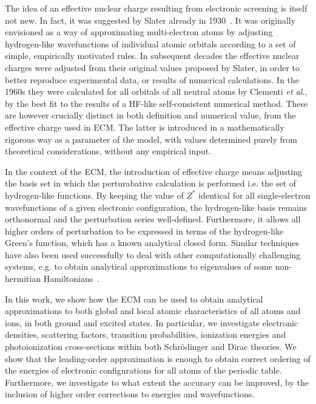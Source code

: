 The idea of an effective nuclear charge resulting from electronic screening is itself not new. In fact, it was suggested by Slater already in 1930~\cite{slater_atomic_1930}. It was originally envisioned as a way of approximating multi-electron atoms by adjusting hydrogen-like wavefunctions of individual atomic orbitals according to a set of simple, empirically motivated rules. In subsequent decades the effective nuclear charges were adjusted from their original values proposed by Slater, in order to better reproduce experimental data, or results of numerical calculations. In the 1960s they were calculated for all orbitals of all neutral atoms by Clementi \textit{et al.}\cite{clementi1963atomic, clementi1967atomic}, by the best fit to the results of a HF-like self-consistent numerical method. These are however crucially distinct in both definition and numerical value, from the effective charge used in ECM. The latter is introduced in a mathematically rigorous way as a parameter of the model, with values determined purely from theoretical considerations, without any empirical input.

In the context of the ECM, the introduction of effective charge means adjusting the basis set in which the perturabative calculation is performed i.e. the set of hydrogen-like functions. By keeping the value of $Z^*$ identical for all single-electron wavefunctions of a given electronic configuration, the hydrogen-like basis remains orthonormal and the perturbation series well-defined. Furthermore, it allows all higher orders of perturbation to be expressed in terms of the hydrogen-like Green's function, which has a known analytical closed form. Similar techniques have also been used successfully to deal with other computationally challenging systems, e.g. to obtain analytical approximations to eigenvalues of some non-hermitian Hamiltonians~\cite{articleOleg}.

In this work, we show how the ECM can be used to obtain analytical approximations to both global and local atomic characteristics of all atoms and ions, in both ground and excited states. In particular, we investigate electronic densities, scattering factors, transition probabilities, ionization energies and photoionization cross-sections within both Schr\"odinger and Dirac theories. We show that the leading-order approximation is enough to obtain correct ordering of the energies of electronic configurations for all atoms of the periodic table. Furthermore, we investigate to what extent the accuracy can be improved, by the inclusion of higher order corrections to energies and wavefunctions.

